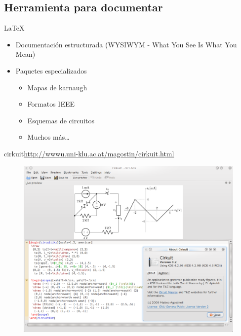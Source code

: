 \documentclass{beamer}
\begin{document}

\subsection{Herramienta para documentar}

\begin{frame}{\LaTeX}
  \begin{itemize}
  \item Documentación estructurada (WYSIWYM - What You See Is What You Mean)
  \item Paquetes especializados
    \begin{itemize}
    \item Mapas de karnaugh
    \item Formatos IEEE
    \item Esquemas de circuitos
    \item Muchos más\dots
    \end{itemize}

  \end{itemize}
\end{frame}

\begin{frame}{cirkuit}{\url{http://wwwu.uni-klu.ac.at/magostin/cirkuit.html}}
  \begin{figure}
    \includegraphics[scale=0.35]{img/cirkuit1.png}
  \end{figure}
\end{frame}
\end{document}

